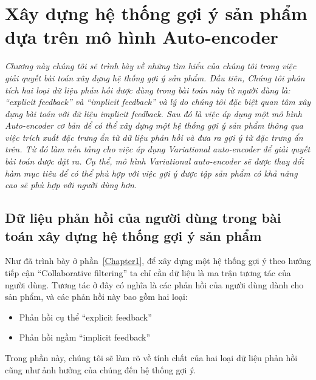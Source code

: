 \chapter{Xây dựng hệ thống gợi ý sản phẩm dựa trên mô hình Auto-encoder}
\graphicspath{{Chapter3/Chapter3Figs}}
\label{Chapter3}

\textit{Chương này chúng tôi sẽ trình bày về những tìm hiểu của chúng tôi trong việc giải quyết bài toán xây dựng hệ thống gợi ý sản phẩm. 
Đầu tiên, Chúng tôi phân tích hai loại dữ liệu phản hồi được dùng trong bài toán này từ người dùng là:
``explicit feedback'' và ``implicit feedback'' và lý do chúng tôi đặc biệt quan tâm xây dựng bài toán với dữ liệu implicit feedback.
Sau đó là việc áp dụng một mô hình Auto-encoder cơ bản để có thể xây dựng một hệ thống gợi ý sản phẩm thông qua việc trích xuất đặc trưng ẩn từ dữ liệu phản hồi và đưa ra gợi ý từ đặc trưng ẩn trên. Từ đó làm nền tảng cho việc áp dụng Variational auto-encoder để giải quyết bài toán được đặt ra. Cụ thể, mô hình Variational auto-encoder sẽ được thay đổi hàm mục tiêu để có thể phù hợp với việc gợi ý được tập sản phẩm có khả năng cao sẽ phù hợp với người dùng hơn.}


\section{Dữ liệu phản hồi của người dùng trong bài toán xây dựng hệ thống gợi ý sản phẩm}
    Như đã trình bày ở phần~\ref{Chapter1}, để xây dựng một hệ thống gợi ý 
    theo hướng tiếp cận ``Collaborative filtering'' ta chỉ cần dữ liệu là ma trận tương tác của người dùng.
    Tương tác ở đây có nghĩa là các phản hồi của người dùng dành cho sản phẩm, và các phản hồi này bao gồm hai loại:
    \begin{itemize}
        \item Phản hồi cụ thể ``explicit feedback''
        \item Phản hồi ngầm ``implicit feedback''
    \end{itemize}
    Trong phần này, chúng tôi sẽ làm rõ về tính chất của hai loại dữ liệu phản hồi cũng như ảnh hưởng của chúng đến hệ thống gợi ý.
